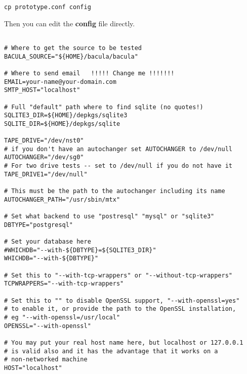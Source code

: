 \footnotesize
\begin{verbatim}
cp prototype.conf config
\end{verbatim}
\normalsize

Then you can edit the {\bf config} file directly.

\footnotesize
\begin{verbatim}

# Where to get the source to be tested
BACULA_SOURCE="${HOME}/bacula/bacula"

# Where to send email   !!!!! Change me !!!!!!!
EMAIL=your-name@your-domain.com
SMTP_HOST="localhost"

# Full "default" path where to find sqlite (no quotes!)
SQLITE3_DIR=${HOME}/depkgs/sqlite3
SQLITE_DIR=${HOME}/depkgs/sqlite

TAPE_DRIVE="/dev/nst0"
# if you don't have an autochanger set AUTOCHANGER to /dev/null
AUTOCHANGER="/dev/sg0"
# For two drive tests -- set to /dev/null if you do not have it
TAPE_DRIVE1="/dev/null"

# This must be the path to the autochanger including its name
AUTOCHANGER_PATH="/usr/sbin/mtx"

# Set what backend to use "postresql" "mysql" or "sqlite3"
DBTYPE="postgresql"

# Set your database here
#WHICHDB="--with-${DBTYPE}=${SQLITE3_DIR}"
WHICHDB="--with-${DBTYPE}"

# Set this to "--with-tcp-wrappers" or "--without-tcp-wrappers"
TCPWRAPPERS="--with-tcp-wrappers"

# Set this to "" to disable OpenSSL support, "--with-openssl=yes"
# to enable it, or provide the path to the OpenSSL installation,
# eg "--with-openssl=/usr/local"
OPENSSL="--with-openssl"

# You may put your real host name here, but localhost or 127.0.0.1
# is valid also and it has the advantage that it works on a
# non-networked machine
HOST="localhost"

\end{verbatim}
\normalsize

